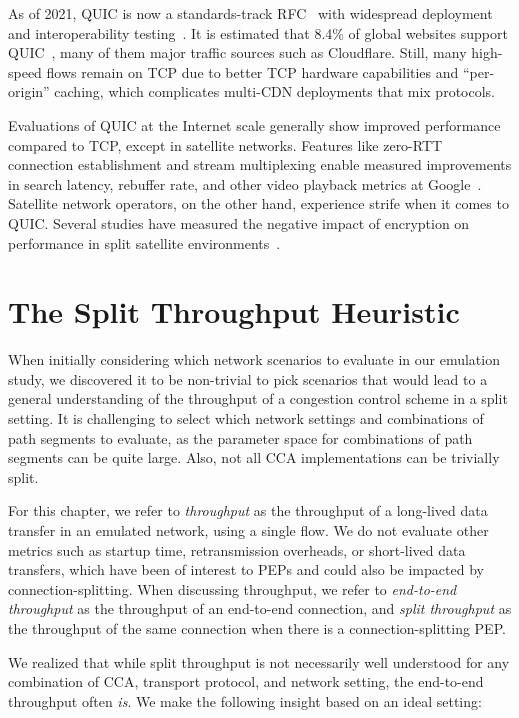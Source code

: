 As of 2021, QUIC is now a standards-track RFC~\cite{rfc9000} with widespread
deployment and interoperability testing~\cite{quic-interop}. It is estimated
that 8.4\% of global websites support QUIC~\cite{w3techs}, many of them major
traffic sources such as Cloudflare.
Still, many high-speed flows remain on TCP due to better TCP hardware
capabilities and ``per-origin'' caching, which complicates multi-CDN
deployments that mix protocols.

Evaluations of QUIC at the Internet scale generally show improved performance
compared to TCP, except in satellite networks. Features like zero-RTT
connection establishment and stream multiplexing enable measured improvements
in search latency, rebuffer rate, and other video playback metrics at
Google~\cite{langley2017quic}. Satellite network operators, on the other hand,
experience strife when it comes to QUIC. Several studies have measured the
negative impact of encryption on performance in split satellite
environments~\cite
{kosek2022quicpep,martin2022suitability,kuhn2021quic-over-sat,border2020evaluating}.

\section{The Split Throughput Heuristic}
\label{sec:splitting:heuristic}

When initially considering which network scenarios to evaluate in our emulation
study, we discovered it to be non-trivial to pick scenarios that would lead to
a general understanding of the throughput of a congestion control scheme in a
split setting. It is challenging to select which network settings and
combinations of path segments to evaluate, as the parameter space for
combinations of path segments can be quite large. Also, not all CCA
implementations can be trivially split.

For this chapter, we refer to \textit{throughput} as the throughput of a
long-lived data transfer in an emulated network, using a single flow.
We do not evaluate other metrics such as startup time, retransmission
overheads, or short-lived data transfers, which have been of interest to
PEPs and could also be impacted by connection-splitting.
When discussing throughput, we refer to \textit{end-to-end throughput} as
the throughput of an end-to-end connection, and \textit{split throughput} as the
throughput of the same connection when there is a connection-splitting PEP.

We realized that while split throughput is not necessarily well
understood for any combination of CCA, transport protocol, and network setting,
the end-to-end throughput often \textit{is}. We make the following insight
based on an ideal setting:

